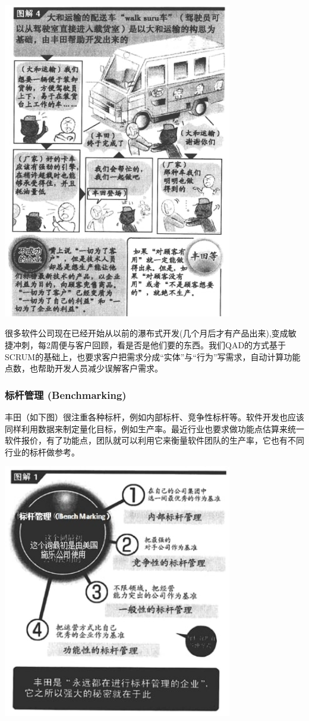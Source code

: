 \includegraphics[width=10cm]{丰田p3.jpg}

很多软件公司现在已经开始从以前的瀑布式开发(几个月后才有产品出来),变成敏捷冲刺，每2周便与客户回顾，看是否是他们要的东西。我们QAD的方式基于SCRUM的基础上，也要求客户把需求分成``实体''与``行为''写需求，自动计算功能点数，也帮助开发人员减少误解客户需求。

\hypertarget{ux6807ux6746ux7ba1ux7406-benchmarking}{%
\subsubsection{标杆管理
(Benchmarking)}\label{ux6807ux6746ux7ba1ux7406-benchmarking}}

丰田（如下图）很注重各种标杆，例如内部标杆、竞争性标杆等。软件开发也应该同样利用数据来制定量化目标，例如生产率。最近行业也要求做功能点估算来统一软件报价，有了功能点，团队就可以利用它来衡量软件团队的生产率，它也有不同行业的标杆做参考。


\includegraphics[width=10cm]{丰田p1.jpg}

